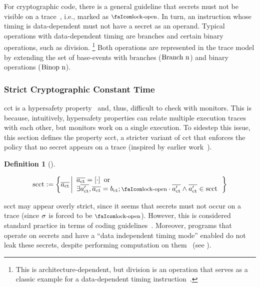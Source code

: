 \documentclass[dvipsnames,conference]{IEEEtran}
\theoremstyle{definition}
\newtheorem{definition}{Definition}[section]
\begin{document}
For cryptographic code, there is a general guideline that secrets must not be visible on a trace~\cite{ctguidelines}, i.e., marked as $\unlock$.
In turn, an instruction whose timing is data-dependent must not have a secret as an operand.
Typical operations with data-dependent timing are branches and certain binary operations, such as division.%
\footnote{
	This is architecture-dependent, but division is an operation that serves as a classic example for a data-dependent timing instruction~\cite[p.~755]{arm-refman}.
}
Both operations are represented in the trace model by extending the set of base-events with branches ($\text{Branch\ n}$) and binary operations ($\text{Binop\ n}$).

\subsubsection{Strict Cryptographic Constant Time}

\gls*{cct} is a hypersafety property~\cite{barthe2018sec} and, thus, difficult to check with monitors.
This is because, intuitively, hypersafety properties can relate multiple execution traces with each other, but monitors work on a single execution.
To sidestep this issue, this section defines the property \gls*{scct}, a stricter variant of \gls*{cct} that enforces the policy that no secret appears on a trace (inspired by earlier work~\cite{almeida2017jasmin}).

\begin{definition}[]\label{def:trace:scctdef}
  
  \noindent\[
  \scctsafe:=\left\{\trace[_{\ctsafe}] \left|\begin{array}{l}
      \trace[_{\ctsafe}]=\hole{\cdot} \text{ or } \\\exists\trace[_{\ctsafe}'],\trace[_{\ctsafe}]=\preevent[_{\ctsafe}];\unlock\cdot\trace[_{\ctsafe}'] \wedge \trace[_{\ctsafe}']\in\scctsafe
    \end{array}\right.\right\}
  \]
\end{definition}

\gls*{scct} may appear overly strict, since it seems that secrets must not occur on a trace (since $\sigma$ is forced to be $\unlock$). 
However, this is considered standard practice in terms of coding guidelines~\cite{ctguidelines}.
Moreover, programs that operate on secrets and have a ``data independent timing mode'' enabled do not leak these secrets, despite performing computation on them~\cite{arm-refman,intel-refman} (see ). 
\end{document}
